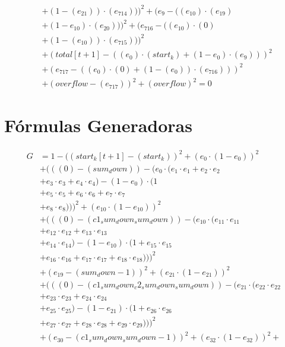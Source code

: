 \documentclass[10pt, a4paper]{article}
\begin{document}
\begin{align*}
& + (1 - (e_{21})) \cdot (e_{714})))^{2} + (e_{9} - ((e_{10})  \cdot  (e_{19}) \\
& + (1 - e_{10})  \cdot  (e_{20})))^{2} + (e_{716} - ((e_{10}) \cdot (0) \\
& + (1 - (e_{10})) \cdot (e_{715})))^{2} \\
& + (total[t+1] - ((e_{0})  \cdot  (start_k) + (1 - e_{0})  \cdot  (e_{9})))^{2} \\
& + (e_{717} - ((e_{0}) \cdot (0) + (1 - (e_{0})) \cdot (e_{716})))^{2} \\
& + (overflow - (e_{717}))^{2} + (overflow)^{2} = 0
\end{align*}\part{Fórmulas Generadoras}
\begin{small}
\begin{align*}
G &= 1 - ((start_k[t+1] - (start_k))^{2} + (e_{0} \cdot (1 - e_{0}))^{2} \\
& + (((0) - (sum_down)) - (e_{0} \cdot (e_{1} \cdot e_{1} + e_{2} \cdot e_{2} \\
& + e_{3} \cdot e_{3} + e_{4} \cdot e_{4}) - (1 - e_{0}) \cdot (1 \\
& + e_{5} \cdot e_{5} + e_{6} \cdot e_{6} + e_{7} \cdot e_{7} \\
& + e_{8} \cdot e_{8})))^{2} + (e_{10} \cdot (1 - e_{10}))^{2} \\
& + (((0) - (c1_sum_down_sum_down)) - (e_{10} \cdot (e_{11} \cdot e_{11} \\
& + e_{12} \cdot e_{12} + e_{13} \cdot e_{13} \\
& + e_{14} \cdot e_{14}) - (1 - e_{10}) \cdot (1 + e_{15} \cdot e_{15} \\
& + e_{16} \cdot e_{16} + e_{17} \cdot e_{17} + e_{18} \cdot e_{18})))^{2} \\
& + (e_{19} - (sum_down - 1))^{2} + (e_{21} \cdot (1 - e_{21}))^{2} \\
& + (((0) - (c1_sum_down_c2_sum_down_sum_down)) - (e_{21} \cdot (e_{22} \cdot e_{22} \\
& + e_{23} \cdot e_{23} + e_{24} \cdot e_{24} \\
& + e_{25} \cdot e_{25}) - (1 - e_{21}) \cdot (1 + e_{26} \cdot e_{26} \\
& + e_{27} \cdot e_{27} + e_{28} \cdot e_{28} + e_{29} \cdot e_{29})))^{2} \\
& + (e_{30} - (c1_sum_down_sum_down - 1))^{2} + (e_{32} \cdot (1 - e_{32}))^{2} + \\

\end{align*}
\end{small}
\end{document}
